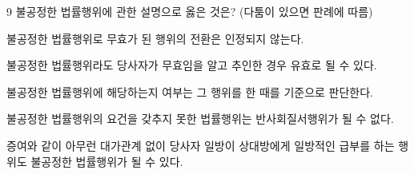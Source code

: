 \begin{question}{9}
불공정한 법률행위에 관한 설명으로 옳은 것은? (다툼이 있으면 판례에 따름)
\begin{choices}
  \item 불공정한 법률행위로 무효가 된 행위의 전환은 인정되지 않는다.
  \item 불공정한 법률행위라도 당사자가 무효임을 알고 추인한 경우 유효로 될 수 있다.
  \item 불공정한 법률행위에 해당하는지 여부는 그 행위를 한 때를 기준으로 판단한다.
  \item 불공정한 법률행위의 요건을 갖추지 못한 법률행위는 반사회질서행위가 될 수 없다.
  \item 증여와 같이 아무런 대가관계 없이 당사자 일방이 상대방에게 일방적인 급부를 하는 행위도 불공정한 법률행위가 될 수 있다.
\end{choices}
\end{question}
